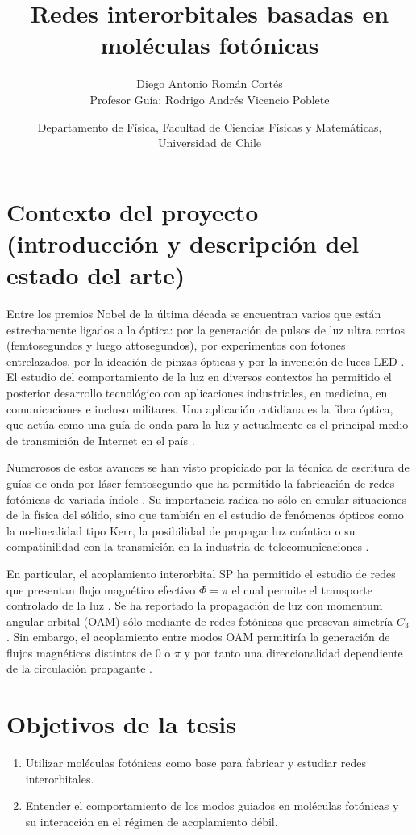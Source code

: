 \documentclass{article}
\author{Diego Antonio Román Cortés\\Profesor Guía: Rodrigo Andrés Vicencio Poblete}
\date{Departamento de Física, Facultad de Ciencias Físicas y Matemáticas, Universidad de Chile}
\title{Redes interorbitales basadas en moléculas fotónicas}
\begin{document}
 \maketitle

\section{Contexto del proyecto (introducción y descripción del estado del arte)}
	
	Entre los premios Nobel de la última década se encuentran varios que están estrechamente ligados a la óptica: por la generación de pulsos de luz ultra cortos (femtosegundos y luego attosegundos), por experimentos con fotones entrelazados, por la ideación de pinzas ópticas y por la invención de luces LED \cite{nobel}. El estudio del comportamiento de la luz en diversos contextos ha permitido el posterior desarrollo tecnológico con aplicaciones industriales, en medicina, en comunicaciones e incluso militares. Una aplicación cotidiana es la fibra óptica, que actúa como una guía de onda para la luz y actualmente es el principal medio de transmición de Internet en el país \cite{fibra}. 
	
	Numerosos de estos avances se han visto propiciado por la técnica de escritura de guías de onda por láser femtosegundo que ha permitido la fabricación de redes fotónicas de variada índole \cite{femto, bics, lieb1, lieb2, artificialFB, FBdynamics}. Su importancia radica no sólo en emular situaciones de la física del sólido, sino que también en el estudio de fenómenos ópticos como la no-linealidad tipo Kerr, la posibilidad de propagar luz cuántica o su compatinilidad con la transmición en la industria de telecomunicaciones \cite{discretesolitons, qed, squeezed, topoquantum, telecom}.
	
	En particular, el acoplamiento interorbital SP ha permitido el estudio de redes que presentan flujo magnético efectivo $\Phi = \pi$ el cual permite el transporte controlado de la luz \cite{interorbital, OAMCaging, ABCaging}. Se ha reportado la propagación de luz con momentum angular orbital (OAM) sólo mediante de redes fotónicas que presevan simetría $C_3$ \cite{OAMWG, vortex}. Sin embargo, el acoplamiento entre modos OAM permitiría la generación de flujos magnéticos distintos de $0$ o $\pi$ y por tanto una direccionalidad dependiente de la circulación propagante \cite{vortextrim, topoOAM}.
\section{Objetivos de la tesis}
\begin{enumerate}
	\item Utilizar moléculas fotónicas como base para fabricar y estudiar redes interorbitales.
	\item Entender el comportamiento de los modos guiados en moléculas fotónicas y su interacción en el régimen de acoplamiento débil.
\end{enumerate}
\end{document}

